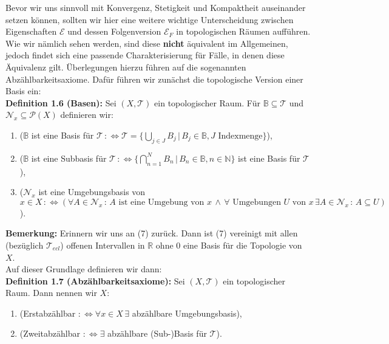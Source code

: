 \documentclass[11pt,english]{smfart}
\begin{document}
Bevor wir uns sinnvoll mit Konvergenz, Stetigkeit und Kompaktheit auseinander setzen können, sollten wir hier eine weitere wichtige Unterscheidung zwischen Eigenschaften \(\mathcal{E}\) und dessen Folgenversion \(\mathcal{E}_F\) in topologischen Räumen aufführen. Wie wir nämlich sehen werden, sind diese \textbf{nicht} äquivalent im Allgemeinen, jedoch findet sich eine passende Charakterisierung für Fälle, in denen diese Äquivalenz gilt. Überlegungen hierzu führen auf die sogenannten Abzählbarkeitsaxiome. Dafür führen wir zunächst die topologische Version einer Basis ein:\\[0.5cm]
\textbf{Definition 1.6 (Basen):} Sei \((X,\mathcal{T})\) ein topologischer Raum. Für \(\mathbb{B} \subseteq \mathcal{T}\) und \(\mathcal{N}_x \subseteq \mathcal{P}(X)\) definieren wir:
\begin{enumerate}
    \item (\(\mathbb{B}\) ist eine Basis für \(\mathcal{T} \, :\Leftrightarrow \mathcal{T} = \{\bigcup_{j \in J} B_j \, | \, B_j \in \mathbb{B}, J \text{ Indexmenge}\}\)),
    \item (\(\mathbb{B}\) ist eine Subbasis für \(\mathcal{T} \, :\Leftrightarrow \{\bigcap_{n=1}^N B_n \, | \, B_n \in \mathbb{B}, n \in \mathbb{N}\}\) ist eine Basis für \(\mathcal{T}\)),
    \item (\(\mathcal{N}_x\) ist eine Umgebungsbasis von \(x \in X \, :\Leftrightarrow (\forall A \in \mathcal{N}_x \, : \, A \text{ ist eine Umgebung von }x \, \land \, \forall \text{ Umgebungen }U \text{ von }x \, \exists A \in \mathcal{N}_x \, : \, A \subseteq U)\)). 
\end{enumerate}

\textbf{Bemerkung:} Erinnern wir uns an (7) zurück. Dann ist (7) vereinigt mit allen (bezüglich \(\mathcal{T}_{ecl}\)) offenen Intervallen in \(\mathbb{R}\) ohne 0 eine Basis für die Topologie von \(X\).\\

Auf dieser Grundlage definieren wir dann:\\[0.5cm]
\textbf{Definition 1.7 (Abzählbarkeitsaxiome):} Sei \((X,\mathcal{T})\) ein topologischer Raum. Dann nennen wir \(X\):
\begin{enumerate}
    \item (Erstabzählbar \(:\Leftrightarrow \forall x \in X \, \exists \) abzählbare Umgebungsbasis),
    \item (Zweitabzählbar \(:\Leftrightarrow \exists \) abzählbare (Sub-)Basis für \(\mathcal{T}\)).
\end{enumerate}
\end{document}

